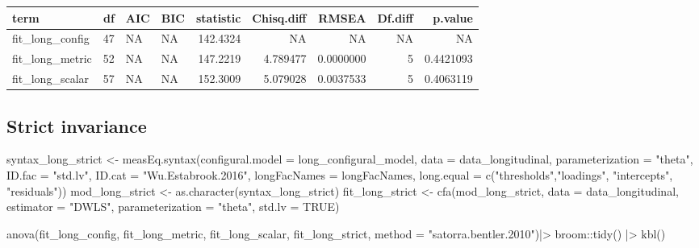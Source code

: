 \documentclass[
  letterpaper,
  DIV=11,
  numbers=noendperiod]{scrreprt}
\newenvironment{Shaded}{\begin{snugshade}}{\end{snugshade}}
\newcommand{\AttributeTok}[1]{\textcolor[rgb]{0.40,0.45,0.13}{#1}}
\newcommand{\ConstantTok}[1]{\textcolor[rgb]{0.56,0.35,0.01}{#1}}
\newcommand{\FunctionTok}[1]{\textcolor[rgb]{0.28,0.35,0.67}{#1}}
\newcommand{\NormalTok}[1]{\textcolor[rgb]{0.00,0.23,0.31}{#1}}
\newcommand{\OtherTok}[1]{\textcolor[rgb]{0.00,0.23,0.31}{#1}}
\newcommand{\SpecialCharTok}[1]{\textcolor[rgb]{0.37,0.37,0.37}{#1}}
\newcommand{\StringTok}[1]{\textcolor[rgb]{0.13,0.47,0.30}{#1}}
\begin{document}
\begin{tabular}[t]{l|r|l|l|r|r|r|r|r}
\hline
term & df & AIC & BIC & statistic & Chisq.diff & RMSEA & Df.diff & p.value\\
\hline
fit\_long\_config & 47 & NA & NA & 142.4324 & NA & NA & NA & NA\\
\hline
fit\_long\_metric & 52 & NA & NA & 147.2219 & 4.789477 & 0.0000000 & 5 & 0.4421093\\
\hline
fit\_long\_scalar & 57 & NA & NA & 152.3009 & 5.079028 & 0.0037533 & 5 & 0.4063119\\
\hline
\end{tabular}

\hypertarget{strict-invariance}{%
\subsection{Strict invariance}\label{strict-invariance}}

\begin{Shaded}
\begin{Highlighting}[]
\NormalTok{syntax\_long\_strict }\OtherTok{\textless{}{-}} \FunctionTok{measEq.syntax}\NormalTok{(}\AttributeTok{configural.model =}\NormalTok{ long\_configural\_model,}
                               \AttributeTok{data =}\NormalTok{ data\_longitudinal,}
                               \AttributeTok{parameterization =} \StringTok{"theta"}\NormalTok{,}
                               \AttributeTok{ID.fac =} \StringTok{"std.lv"}\NormalTok{, }\AttributeTok{ID.cat =} \StringTok{"Wu.Estabrook.2016"}\NormalTok{,}
                               \AttributeTok{longFacNames =}\NormalTok{ longFacNames,}
                               \AttributeTok{long.equal  =} \FunctionTok{c}\NormalTok{(}\StringTok{"thresholds"}\NormalTok{,}\StringTok{"loadings"}\NormalTok{,}
                                               \StringTok{"intercepts"}\NormalTok{, }\StringTok{"residuals"}\NormalTok{))}
\NormalTok{mod\_long\_strict }\OtherTok{\textless{}{-}} \FunctionTok{as.character}\NormalTok{(syntax\_long\_strict)}
\NormalTok{fit\_long\_strict }\OtherTok{\textless{}{-}} \FunctionTok{cfa}\NormalTok{(mod\_long\_strict, }\AttributeTok{data =}\NormalTok{ data\_longitudinal, }\AttributeTok{estimator =} \StringTok{"DWLS"}\NormalTok{,}
                  \AttributeTok{parameterization =} \StringTok{"theta"}\NormalTok{, }\AttributeTok{std.lv =} \ConstantTok{TRUE}\NormalTok{)}

\FunctionTok{anova}\NormalTok{(fit\_long\_config, fit\_long\_metric, fit\_long\_scalar, fit\_long\_strict, }\AttributeTok{method =} \StringTok{"satorra.bentler.2010"}\NormalTok{)}\SpecialCharTok{|\textgreater{}} 
\NormalTok{  broom}\SpecialCharTok{::}\FunctionTok{tidy}\NormalTok{() }\SpecialCharTok{|\textgreater{}} 
  \FunctionTok{kbl}\NormalTok{()}
\end{Highlighting}
\end{Shaded}
\end{document}

